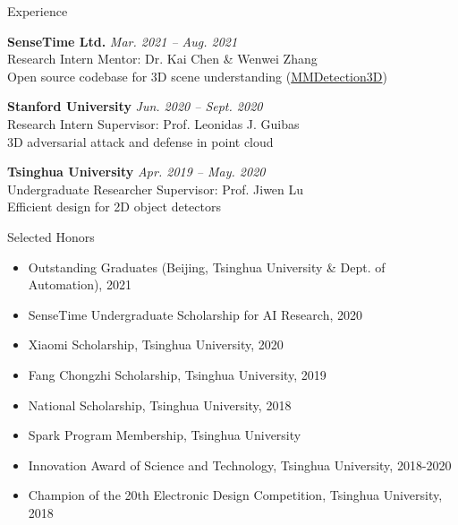 \documentclass{resume} %
\begin{document}
\begin{rSection}{Experience}

\textbf{SenseTime Ltd.} \hfill {\em Mar. 2021 -- Aug. 2021}\\
{Research Intern} \hfill {Mentor: Dr. Kai Chen \& Wenwei Zhang}\\
Open source codebase for 3D scene understanding (\href{https://github.com/open-mmlab/mmdetection3d}{MMDetection3D})


\textbf{Stanford University} \hfill {\em Jun. 2020 -- Sept. 2020}\\
{Research Intern} \hfill {Supervisor: Prof. Leonidas J. Guibas}\\
3D adversarial attack and defense in point cloud


\textbf{Tsinghua University} \hfill {\em Apr. 2019 -- May. 2020}\\
{Undergraduate Researcher} \hfill {Supervisor: Prof. Jiwen Lu}\\
Efficient design for 2D object detectors

\end{rSection}



\begin{rSection}{Selected Honors}

\begin{itemize}
    \item Outstanding Graduates (Beijing, Tsinghua University \& Dept. of Automation), 2021
    
    \item SenseTime Undergraduate Scholarship for AI Research, 2020
    
    \item Xiaomi Scholarship, Tsinghua University, 2020
    
    \item Fang Chongzhi Scholarship, Tsinghua University, 2019
    
    \item National Scholarship, Tsinghua University, 2018
    
    \item Spark Program Membership, Tsinghua University
    
    \item Innovation Award of Science and Technology, Tsinghua University, 2018-2020
    
    \item Champion of the 20th Electronic Design Competition, Tsinghua University, 2018
\end{itemize}

\end{rSection}
\end{document}
